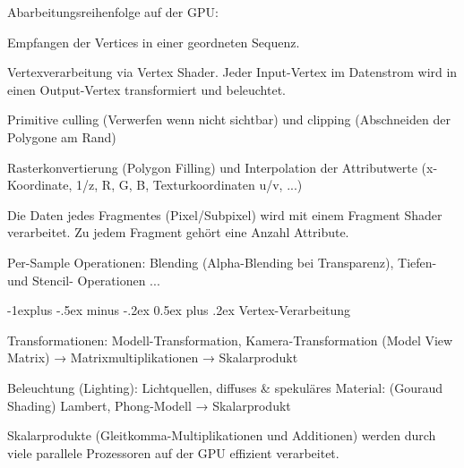 \documentclass[landscape]{article}
\makeatletter
\renewcommand{\subsection}{\@startsection{subsection}{2}{0mm}%
                                {-1explus -.5ex minus -.2ex}%
                                {0.5ex plus .2ex}%
                                {\normalfont\normalsize\bfseries}}
\makeatother
\begin{document}
\begin{multicols}{3}
  Abarbeitungsreihenfolge auf der GPU:
  \begin{itemize*}
    \item Empfangen der Vertices in einer geordneten Sequenz.
    \item Vertexverarbeitung via Vertex Shader. Jeder Input-Vertex im Datenstrom wird in einen Output-Vertex transformiert und beleuchtet.
    \item Primitive culling (Verwerfen wenn nicht sichtbar) und clipping (Abschneiden der Polygone am Rand)
    \item Rasterkonvertierung (Polygon Filling) und Interpolation der Attributwerte (x-Koordinate, 1/z, R, G, B, Texturkoordinaten u/v, ...)
    \item Die Daten jedes Fragmentes (Pixel/Subpixel) wird mit einem Fragment Shader verarbeitet. Zu jedem Fragment gehört eine Anzahl Attribute.
    \item Per-Sample Operationen: Blending (Alpha-Blending bei Transparenz), Tiefen- und Stencil- Operationen ...
  \end{itemize*}
  
  
  \subsection{Vertex-Verarbeitung}
  \begin{itemize*}
    \item Transformationen: Modell-Transformation, Kamera-Transformation (Model View Matrix) → Matrixmultiplikationen → Skalarprodukt
    \item Beleuchtung (Lighting): Lichtquellen, diffuses \& spekuläres Material: (Gouraud Shading) Lambert, Phong-Modell → Skalarprodukt
    \item Skalarprodukte (Gleitkomma-Multiplikationen und Additionen) werden durch viele parallele Prozessoren auf der GPU effizient verarbeitet.
  \end{itemize*}
  
  

\end{multicols}
\end{document}
